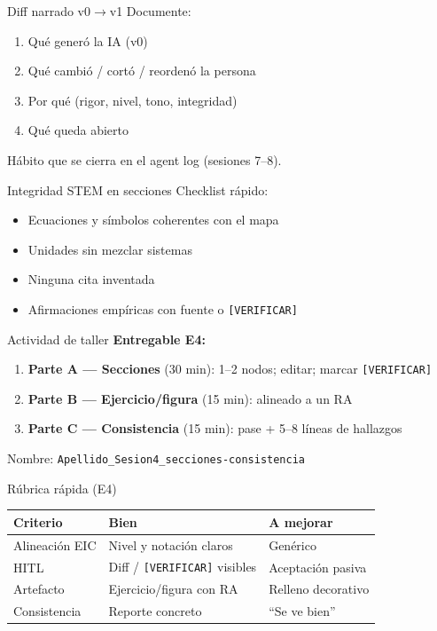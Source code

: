 \documentclass[aspectratio=169,11pt]{beamer}
\begin{document}
\begin{frame}{Diff narrado v0$\rightarrow$v1}
Documente:
\begin{enumerate}
\item Qué generó la IA (v0)
\item Qué cambió / cortó / reordenó la persona
\item Por qué (rigor, nivel, tono, integridad)
\item Qué queda abierto
\end{enumerate}
Hábito que se cierra en el agent log (sesiones 7--8).
\end{frame}

\begin{frame}{Integridad STEM en secciones}
Checklist rápido:
\begin{itemize}
\item[$\square$] Ecuaciones y símbolos coherentes con el mapa
\item[$\square$] Unidades sin mezclar sistemas
\item[$\square$] Ninguna cita inventada
\item[$\square$] Afirmaciones empíricas con fuente o \texttt{[VERIFICAR]}
\end{itemize}
\end{frame}

\begin{frame}{Actividad de taller}
\textbf{Entregable E4:}
\begin{enumerate}
\item \textbf{Parte A --- Secciones} (30 min): 1--2 nodos; editar; marcar \texttt{[VERIFICAR]}
\item \textbf{Parte B --- Ejercicio/figura} (15 min): alineado a un RA
\item \textbf{Parte C --- Consistencia} (15 min): pase + 5--8 líneas de hallazgos
\end{enumerate}
Nombre: \texttt{Apellido\_Sesion4\_secciones-consistencia}
\end{frame}

\begin{frame}{Rúbrica rápida (E4)}
\begin{tabularx}{\textwidth}{@{}lXX@{}}
\toprule
Criterio & Bien & A mejorar \\
\midrule
Alineación EIC & Nivel y notación claros & Genérico \\
HITL & Diff / \texttt{[VERIFICAR]} visibles & Aceptación pasiva \\
Artefacto & Ejercicio/figura con RA & Relleno decorativo \\
Consistencia & Reporte concreto & ``Se ve bien'' \\
\bottomrule
\end{tabularx}
\end{frame}
\end{document}
